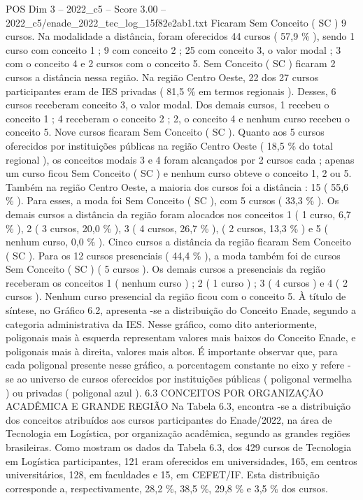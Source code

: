 \begin{textsample}{POS Dim 3 – 2022\_c5 – Score 3.00 – 2022\_c5/enade\_2022\_tec\_log\_15f82e2ab1.txt}
Ficaram Sem Conceito ( SC ) 9 cursos.
Na modalidade a distância, foram oferecidos 44 cursos ( 57,9 \% ), sendo 1 curso com conceito 1 ; 9 com conceito 2 ; 25 com conceito 3, o valor modal ; 3 com o conceito 4 e 2 cursos com o conceito 5.
Sem Conceito ( SC ) ficaram 2 cursos a distância nessa região.
Na região Centro Oeste, 22 dos 27 cursos participantes eram de IES privadas ( 81,5 \% em termos regionais ).
Desses, 6 cursos receberam conceito 3, o valor modal.
Dos demais cursos, 1 recebeu o conceito 1 ; 4 receberam o conceito 2 ; 2, o conceito 4 e nenhum curso recebeu o conceito 5.
Nove cursos ficaram Sem Conceito ( SC ).
Quanto aos 5 cursos oferecidos por instituições públicas na região Centro Oeste ( 18,5 \% do total regional ), os conceitos modais 3 e 4 foram alcançados por 2 cursos cada ; apenas um curso ficou Sem Conceito ( SC ) e nenhum curso obteve o conceito 1, 2 ou 5.
Também na região Centro Oeste, a maioria dos cursos foi a distância : 15 ( 55,6 \% ).
Para esses, a moda foi Sem Conceito ( SC ), com 5 cursos ( 33,3 \% ).
Os demais cursos a distância da região foram alocados nos conceitos 1 ( 1 curso, 6,7 \% ), 2 ( 3 cursos, 20,0 \% ), 3 ( 4 cursos, 26,7 \% ), ( 2 cursos, 13,3 \% ) e 5 ( nenhum curso, 0,0 \% ).
Cinco cursos a distância da região ficaram Sem Conceito ( SC ).
Para os 12 cursos presenciais ( 44,4 \% ), a moda também foi de cursos Sem Conceito ( SC ) ( 5 cursos ).
Os demais cursos a presenciais da região receberam os conceitos 1 ( nenhum curso ) ; 2 ( 1 curso ) ; 3 ( 4 cursos ) e 4 ( 2 cursos ).
Nenhum curso presencial da região ficou com o conceito 5.
À título de síntese, no Gráfico 6.2, apresenta -se a distribuição do Conceito Enade, segundo a categoria administrativa da IES.
Nesse gráfico, como dito anteriormente, poligonais mais à esquerda representam valores mais baixos do Conceito Enade, e poligonais mais à direita, valores mais altos.
É importante observar que, para cada poligonal presente nesse gráfico, a porcentagem constante no eixo y refere -se ao universo de cursos oferecidos por instituições públicas ( poligonal vermelha ) ou privadas ( poligonal azul ). 6.3 CONCEITOS POR ORGANIZAÇÃO ACADÊMICA E GRANDE REGIÃO Na Tabela 6.3, encontra -se a distribuição dos conceitos atribuídos aos cursos participantes do Enade/2022, na área de Tecnologia em Logística, por organização acadêmica, segundo as grandes regiões brasileiras.
Como mostram os dados da Tabela 6.3, dos 429 cursos de Tecnologia em Logística participantes, 121 eram oferecidos em universidades, 165, em centros universitários, 128, em faculdades e 15, em CEFET/IF.
Esta distribuição corresponde a, respectivamente, 28,2 \%, 38,5 \%, 29,8 \% e 3,5 \% dos cursos.

\end{textsample}
